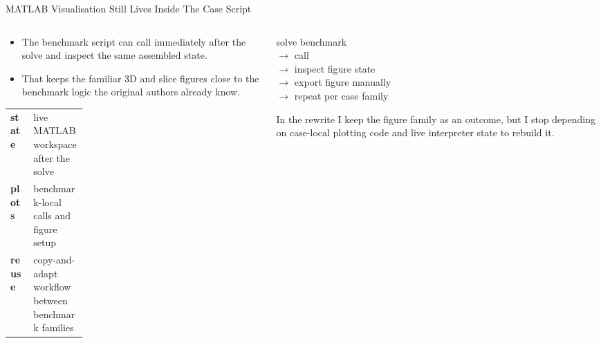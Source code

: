 \documentclass[aspectratio=169,10pt]{beamer}
\begin{document}
\begin{frame}{MATLAB Visualisation Still Lives Inside The Case Script}
\small
\begin{columns}[T,totalwidth=\textwidth]
\begin{column}{0.56\textwidth}
\begin{softbox}
\begin{itemize}
  \item The benchmark script can call  immediately after the solve and inspect the same assembled state.
  \item That keeps the familiar 3D and slice figures close to the benchmark logic the original authors already know.
\end{itemize}
\end{softbox}
\begin{softbox}
\begin{tabularx}{\linewidth}{p{0.30\linewidth}Y}
\textbf{state} & live MATLAB workspace after the solve \\
\textbf{plots} & benchmark-local  calls and figure setup \\
\textbf{reuse} & copy-and-adapt workflow between benchmark families \\
\end{tabularx}
\end{softbox}
\end{column}
\begin{column}{0.40\textwidth}
\begin{pseudobox}
solve benchmark\\
\(\rightarrow\) call \\
\(\rightarrow\) inspect figure state\\
\(\rightarrow\) export figure manually\\
\(\rightarrow\) repeat per case family
\end{pseudobox}
\vspace{0.18cm}
\begin{callout}
In the rewrite I keep the figure family as an outcome, but I stop depending on case-local plotting code and live interpreter state to rebuild it.
\end{callout}
\end{column}
\end{columns}
\end{frame}

\end{document}
